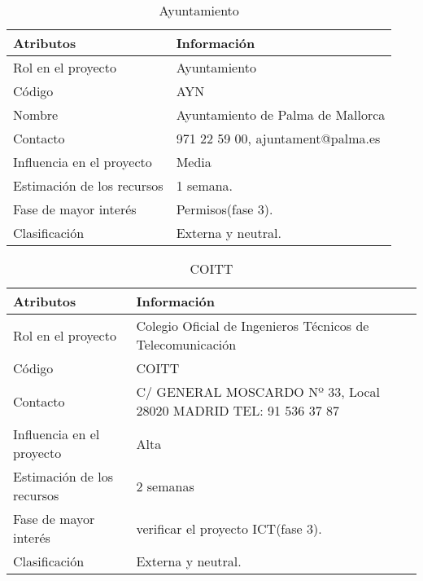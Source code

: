 \begin{table}[H]
\centering
\begin{tabular}{|m{5cm}|m{11cm}| }
\hline
\rowcolor{gray!50} \centering Atributos & Información  \\
\hline
\hline
 Rol en el proyecto & Ayuntamiento \\
 \hline
 Código & AYN \\
 \hline
 Nombre & Ayuntamiento de Palma de Mallorca \\
\hline
 Contacto & 971 22 59 00, ajuntament@palma.es \\
\hline
 Influencia en el proyecto & Media \\
\hline
 Estimación de los recursos & 1 semana. \\
\hline
 Fase de mayor interés & Permisos(fase 3). \\
\hline
Clasificación & Externa y neutral.\\
 \hline
\end{tabular}
\caption{Ayuntamiento}
\label{table:ta1}
\end{table}

\begin{table}[H]
\centering
\begin{tabular}{|m{5cm}|m{11cm}| }
\hline
\rowcolor{gray!50} \centering Atributos & Información  \\
\hline
\hline
 Rol en el proyecto & Colegio Oficial de Ingenieros Técnicos de Telecomunicación \\
 \hline
 Código & COITT \\
 \hline
 Contacto & C/ GENERAL MOSCARDO Nº 33, Local 
28020 MADRID
TEL: 91 536 37 87 \\
\hline
 Influencia en el proyecto & Alta \\
\hline
 Estimación de los recursos & 2 semanas \\
\hline
 Fase de mayor interés & verificar el proyecto ICT(fase 3). \\
\hline
Clasificación & Externa y neutral.\\
 \hline
\end{tabular}
\caption{COITT}
\label{table:ta1}
\end{table}